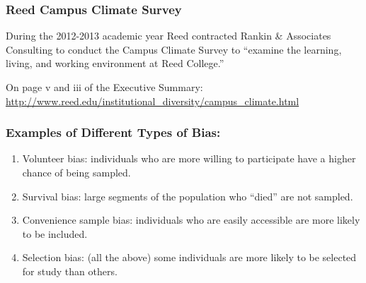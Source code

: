 \documentclass[handout]{beamer}
\newcommand{\blue}[1]{\textcolor{blue2}{#1}}
\begin{document}
\begin{frame}
\frametitle{Reed Campus Climate Survey}

During the 2012-2013 academic year Reed contracted Rankin \& Associates Consulting to conduct the Campus Climate Survey to ``examine the learning, living, and working environment at Reed College.''

\vspace{0.5cm}

\pause On page v and iii of the Executive Summary: \blue{\href{http://www.reed.edu/institutional\_diversity/campus\_climate.html}{http://www.reed.edu/institutional\_diversity/campus\_climate.html}}


\end{frame}


\begin{frame}
\frametitle{Examples of Different Types of Bias:}

%
%
\begin{enumerate}
\item \blue{Volunteer bias}:  individuals who are more willing to participate have a higher chance of being sampled.
\item \blue{Survival bias}:  large segments of the population who ``died'' are not sampled.
\item \blue{Convenience sample bias}:  individuals who are easily accessible are more likely to be included.
\item \blue{Selection bias}:  (all the above) some individuals are more likely to be selected for study than others.
\end{enumerate}

\end{frame}
\end{document}
